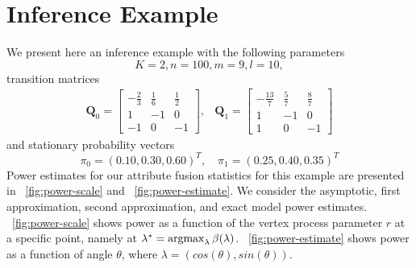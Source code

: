 \documentclass[10pt,journal,compsoc]{IEEEtran}
\theoremstyle{definition}
\newcommand{\argmax}{\operatornamewithlimits{argmax}}
\begin{document}
\section{Inference Example}
We present here an inference example with the following
parameters
\begin{equation*}
  K = 2, n = 100, m = 9, l = 10,
\end{equation*}
transition matrices
\begin{equation*}
  \label{eq:55}
  \begin{matrix}
  \mathbf{Q}_0 = \begin{bmatrix}
    -\tfrac{2}{3} & \tfrac{1}{6} & \tfrac{1}{2} \\
    1 & -1 & 0 \\
    -1 & 0 & -1 
  \end{bmatrix},
  & \mathbf{Q}_1 = \begin{bmatrix}
    -\tfrac{13}{7} & \tfrac{5}{7} & \tfrac{8}{7} \\
    1 & -1 & 0 \\
    1 & 0 & -1
  \end{bmatrix}
  \end{matrix}
\end{equation*}
and stationary probability vectors
\begin{equation*}
  \pi_0 = (0.10,0.30,0.60)^{T}, \quad \pi_1 = (0.25,0.40,0.35)^{T}
\end{equation*}
Power estimates for our attribute fusion statistics for this example
are presented in \figurename~\ref{fig:power-scale} and
\figurename~\ref{fig:power-estimate}. We consider the asymptotic,
first approximation, second approximation, and exact model power
estimates. \figurename~\ref{fig:power-scale} shows power as a function
of the vertex process parameter $r$ at a specific point, namely at
$\lambda^{*} = \argmax_{\lambda} \beta(\lambda)$.
\figurename~\ref{fig:power-estimate} shows power as a function of
angle $\theta$, where $\lambda = (cos(\theta), sin(\theta))$.
\end{document}
